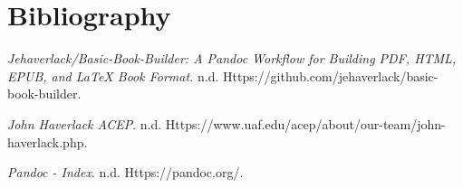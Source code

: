 \documentclass[
  12pt,
  openany]{book}
\newlength{\cslhangindent}
\newenvironment{CSLReferences}[2] %
 {\begin{list}{}{%
  \setlength{\itemindent}{0pt}
  \setlength{\leftmargin}{0pt}
  \setlength{\parsep}{0pt}
  \ifodd #1
   \setlength{\leftmargin}{\cslhangindent}
   \setlength{\itemindent}{-1\cslhangindent}
  \fi
  \setlength{\itemsep}{#2\baselineskip}}}
 {\end{list}}
\begin{document}
\printindex

\renewcommand{\clearpage}{\oldclearpage}
\renewcommand{\cleardoublepage}{\oldcleardoublepage}

\clearpage
\thispagestyle{plain}

\chapter*{Bibliography}\label{bibliography-1}

\protect{}\label{refs}
\begin{CSLReferences}{1}{1}
\emph{Jehaverlack/Basic-Book-Builder: {A Pandoc} Workflow for Building
{PDF}, {HTML}, {EPUB}, and {LaTeX} Book Format.} n.d.
Https://github.com/jehaverlack/basic-book-builder.

\emph{John {Haverlack} \textbar{} {ACEP}}. n.d.
Https://www.uaf.edu/acep/about/our-team/john-haverlack.php.

\emph{Pandoc - Index}. n.d. Https://pandoc.org/.

\end{CSLReferences}

\backmatter
\end{document}
